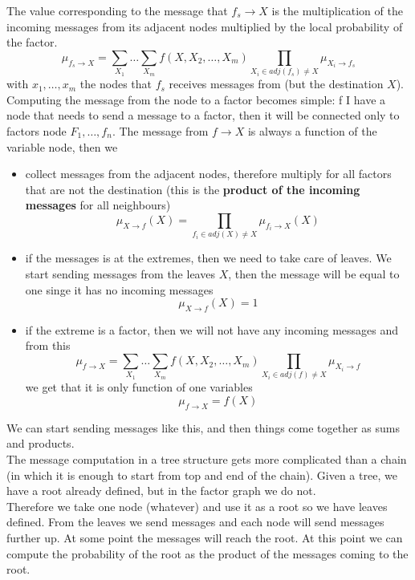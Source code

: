             The value corresponding to the message that $f_s \rightarrow X$ is the multiplication of the incoming messages from its adjacent nodes multiplied by the local probability of the factor.
            $$\mu_{f_s \rightarrow X} = \sum_{X_1}\dots\sum_{X_{m}} f(X, X_2, \dots, X_m) \prod _{X_i \in adj(f_s) \neq X} \mu_{X_i \rightarrow f_s}$$
            with $x_1, \dots, x_m$ the nodes that $f_s$ receives messages from (but the destination $X$).\\
            
            Computing the message from the node to a factor becomes simple: 
            f I have a node that needs to send a message to a factor, then it will be connected only to factors node $F_1, \dots, f_n$. The message from $f \rightarrow X$ is always a function of the variable node, then we
            \begin{itemize}
                \item collect messages from the adjacent nodes, therefore multiply for all factors that are not the destination (this is the \textbf{product of the incoming messages} for all neighbours)
                $$\mu _ {X \rightarrow f} (X) = \prod _{f_i \in adj(X) \neq X} \mu _{f_i \rightarrow X} (X)$$
                \item if the messages is at the extremes, then we need to take care of leaves. We start sending messages from the leaves $X$, then the message will be equal to one singe it has no incoming messages
                $$\mu _{X \rightarrow f}(X) = 1$$
                \item if the extreme is a factor, then we will not have any incoming messages and from this
                $$\mu_{f \rightarrow X} = \sum_{X_1}\dots\sum_{X_{m}} f(X, X_2, \dots, X_m) \prod _{X_i \in adj(f) \neq X} \mu_{X_i \rightarrow f}$$
                we get that it is only function of one variables
                $$\mu_{f \rightarrow X} = f(X)$$
            \end{itemize}
            We can start sending messages like this, and then things come together as sums and products.\\
            
            The message computation in a tree structure gets more complicated than a chain (in which it is enough to start from top and end of the chain). Given a tree, we have a root already defined, but in the factor graph we do not.\\
            Therefore we take one node (whatever) and use it as a root so we have leaves defined. From the leaves we send messages and each node will send messages further up. At some point the messages will reach the root. At this point we can compute the probability of the root as the product of the messages coming to the root.
            
